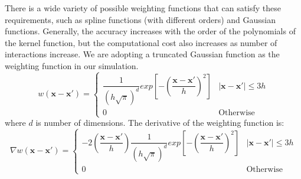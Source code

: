 There is a wide variety of possible weighting functions that can satisfy these requirements, such as spline functions (with different orders) and Gaussian functions. Generally, the accuracy increases with the order of the polynomials of the kernel function, but the computational cost also increases as number of interactions increase. 
We are adopting a truncated Gaussian function as the weighting function in our simulation.
\begin{equation}
w\left(\textbf{x} - \textbf{x} \prime \right) = 
\begin{cases} 
      \dfrac{1}{\left(h \sqrt{\pi}\right)^d} exp \left[- \left(\dfrac{\textbf{x} - \textbf{x} \prime}{h} \right)^2 \right] &  \vert \textbf{x} - \textbf{x} \prime \vert \leq 3h\\
      0 & \text{Otherwise}
\end{cases}
\label{eq:SPH-kernel}
\end{equation}
where $d$ is number of dimensions.
The derivative of the weighting function is:
\begin{equation}
\nabla w\left(\textbf{x} - \textbf{x} \prime \right) = 
\begin{cases} 
      -2\left(\dfrac{\textbf{x} - \textbf{x} \prime}{h}\right) \dfrac{1}{\left(h \sqrt{\pi}\right)^d} exp \left[- \left(\dfrac{\textbf{x} - \textbf{x} \prime}{h}\right)^2 \right] &  \vert \textbf{x} - \textbf{x} \prime \vert \leq 3h\\
      0 & \text{Otherwise}
\end{cases}
\label{eq:SPH-kernel-gradient}
\end{equation}

